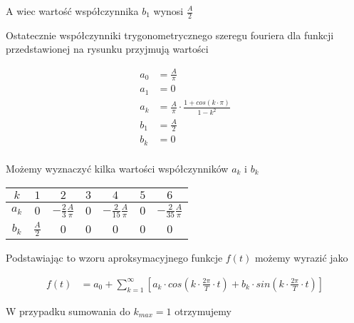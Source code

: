 
A wiec wartość współczynnika $b_1$ wynosi $\frac{A}{2}$

Ostatecznie współczynniki trygonometrycznego szeregu fouriera dla funkcji przedstawionej na rysunku przyjmują wartości

\begin{equation}
\begin{aligned}
a_0&=\frac{A}{\pi}\\
a_1&=0\\
a_k&=\frac{A}{\pi} \cdot \frac{1 + cos\left(k\cdot\pi \right)}{1-k^2}\\
b_1&=\frac{A}{2}\\
b_k&=0\\
\end{aligned}
\end{equation}

Możemy wyznaczyć kilka wartości współczynników $a_k$ i $b_k$

\begin{table}[H]
  \centering  
  \begin{tabular}{|c|c|c|c|c|c|c|}
    \hline 
    $k$ & $1$ & $2$ & $3$ & $4$ & $5$ & $6$\\ 
    \hline 
    $a_k$ & $0$ & $-\frac{2}{3}\frac{A}{\pi}$ & $0$ & $-\frac{2}{15}\frac{A}{\pi}$ & $0$ & $-\frac{2}{35}\frac{A}{\pi}$\\ 
    \hline 
    $b_k$ & $\frac{A}{2}$ & $0$ & $0$ & $0$ & $0$ & $0$\\ 
    \hline 
  \end{tabular} 
\end{table}

Podstawiając to wzoru aproksymacyjnego funkcje $f(t)$ możemy wyrazić jako

\begin{equation}
\begin{aligned}
f(t) &= a_0 + \sum_{k=1}^{\infty} \left[ a_k \cdot cos\left( k \cdot \frac{2\pi}{T} \cdot t\right) + b_k \cdot sin\left(k \cdot \frac{2\pi}{T} \cdot t\right)\right]
\end{aligned}
\end{equation}

W przypadku sumowania do $k_{max}=1$ otrzymujemy 

